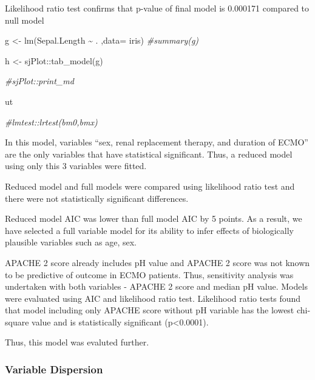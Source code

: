 \documentclass[
]{article}
\newenvironment{Shaded}{\begin{snugshade}}{\end{snugshade}}
\newcommand{\AttributeTok}[1]{\textcolor[rgb]{0.77,0.63,0.00}{#1}}
\newcommand{\CommentTok}[1]{\textcolor[rgb]{0.56,0.35,0.01}{\textit{#1}}}
\newcommand{\FunctionTok}[1]{\textcolor[rgb]{0.00,0.00,0.00}{#1}}
\newcommand{\NormalTok}[1]{#1}
\newcommand{\OtherTok}[1]{\textcolor[rgb]{0.56,0.35,0.01}{#1}}
\newcommand{\SpecialCharTok}[1]{\textcolor[rgb]{0.00,0.00,0.00}{#1}}
\begin{document}
Likelihood ratio test confirms that p-value of final model is 0.000171
compared to null model

\begin{Shaded}
\begin{Highlighting}[]
\NormalTok{g }\OtherTok{\textless{}{-}} \FunctionTok{lm}\NormalTok{(Sepal.Length }\SpecialCharTok{\textasciitilde{}}\NormalTok{ . ,}\AttributeTok{data=}\NormalTok{ iris)}
\CommentTok{\#summary(g)}

\NormalTok{h }\OtherTok{\textless{}{-}}\NormalTok{ sjPlot}\SpecialCharTok{::}\FunctionTok{tab\_model}\NormalTok{(g)}

\CommentTok{\#sjPlot::print\_md}
\end{Highlighting}
\end{Shaded}

ut

\begin{Shaded}
\begin{Highlighting}[]
\CommentTok{\#lmtest::lrtest(bm0,bmx)}
\end{Highlighting}
\end{Shaded}

In this model, variables ``sex, renal replacement therapy, and duration
of ECMO'' are the only variables that have statistical significant.
Thus, a reduced model using only this 3 variables were fitted.

Reduced model and full models were compared using likelihood ratio test
and there were not statistically significant differences.

Reduced model AIC was lower than full model AIC by 5 points. As a
result, we have selected a full variable model for its ability to infer
effects of biologically plausible variables such as age, sex.

APACHE 2 score already includes pH value and APACHE 2 score was not
known to be predictive of outcome in ECMO patients. Thus, sensitivity
analysis was undertaken with both variables - APACHE 2 score and median
pH value. Models were evaluated using AIC and likelihood ratio test.
Likelihood ratio tests found that model including only APACHE score
without pH variable has the lowest chi-square value and is statistically
significant (p\textless0.0001).

Thus, this model was evaluted further.

\hypertarget{variable-dispersion}{%
\subsubsection{Variable Dispersion}\label{variable-dispersion}}
\end{document}
